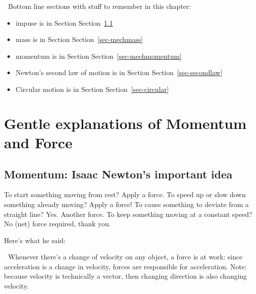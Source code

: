 \documentclass[
  letterpaper,
  DIV=11,
  numbers=noendperiod,
  oneside]{scrreprt}
\begin{document}
\begin{tcolorbox}[enhanced jigsaw, colbacktitle=quarto-callout-tip-color!10!white, rightrule=.15mm, toptitle=1mm, arc=.35mm, breakable, left=2mm, title={Tip}, colframe=quarto-callout-tip-color-frame, bottomrule=.15mm, colback=white, titlerule=0mm, leftrule=.75mm, toprule=.15mm, coltitle=black, opacityback=0, opacitybacktitle=0.6, bottomtitle=1mm]

🔐 Bottom line sections with stuff to remember in this chapter:

\begin{itemize}
\item
  impuse is in Section Section~\ref{sec-momentum}
\item
  mass is in Section Section~\ref{sec-mechmass}
\item
  momentum is in Section Section~\ref{sec-mechmomentum}
\item
  Newton's second law of motion is in Section
  Section~\ref{sec-secondlaw}
\item
  Circular motion is in Section Section~\ref{sec-circular}
\end{itemize}

\end{tcolorbox}

\chapter{Gentle explanations of Momentum and
Force}\label{gentle-explanations-of-momentum-and-force}

\section{Momentum: Isaac Newton's important idea}\label{sec-momentum}

To start something moving from rest? Apply a force. To speed up or slow
down something already moving? Apply a force! To cause something to
deviate from a straight line? Yes. Another force. To keep something
moving at a constant speed? No (net) force required, thank you.

Here's what he said:

\begin{tcolorbox}[enhanced jigsaw, colbacktitle=quarto-callout-important-color!10!white, rightrule=.15mm, toptitle=1mm, arc=.35mm, breakable, left=2mm, title={Important}, colframe=quarto-callout-important-color-frame, bottomrule=.15mm, colback=white, titlerule=0mm, leftrule=.75mm, toprule=.15mm, coltitle=black, opacityback=0, opacitybacktitle=0.6, bottomtitle=1mm]

🫵 Whenever there's a change of velocity on any object, a force is at
work: since acceleration is a change in velocity, forces are responsible
for acceleration. Note: because velocity is technically a vector, then
changing direction is also changing velocity.

\end{tcolorbox}
\end{document}
